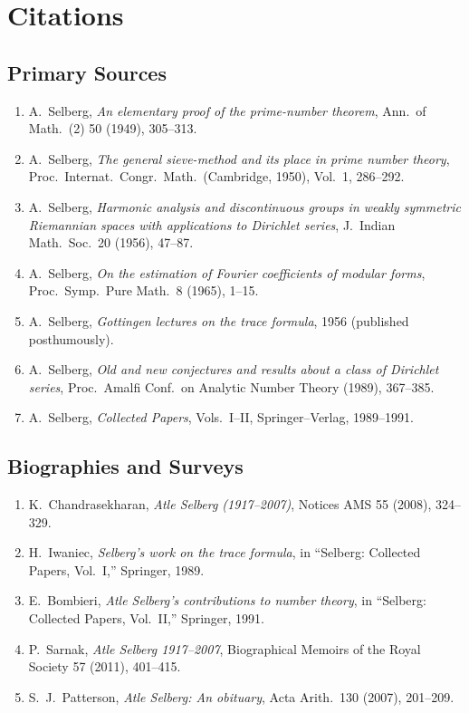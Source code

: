 \section{Citations}\subsection*{Primary Sources}
\begin{enumerate}
    \item A.\ Selberg, \textit{An elementary proof of the prime-number theorem}, Ann.\ of Math.\ (2) 50 (1949), 305--313.
    \item A.\ Selberg, \textit{The general sieve-method and its place in prime number theory}, Proc.\ Internat.\ Congr.\ Math.\ (Cambridge, 1950), Vol.\ 1, 286--292.
    \item A.\ Selberg, \textit{Harmonic analysis and discontinuous groups in weakly symmetric Riemannian spaces with applications to Dirichlet series}, J.\ Indian Math.\ Soc.\ 20 (1956), 47--87.
    \item A.\ Selberg, \textit{On the estimation of Fourier coefficients of modular forms}, Proc.\ Symp.\ Pure Math.\ 8 (1965), 1--15.
    \item A.\ Selberg, \textit{Gottingen lectures on the trace formula}, 1956 (published posthumously).
    \item A.\ Selberg, \textit{Old and new conjectures and results about a class of Dirichlet series}, Proc.\ Amalfi Conf.\ on Analytic Number Theory (1989), 367--385.
    \item A.\ Selberg, \textit{Collected Papers}, Vols.\ I--II, Springer--Verlag, 1989--1991.
\end{enumerate}

\subsection*{Biographies and Surveys}
\begin{enumerate}
    \item K.\ Chandrasekharan, \textit{Atle Selberg (1917--2007)}, Notices AMS 55 (2008), 324--329.
    \item H.\ Iwaniec, \textit{Selberg's work on the trace formula}, in ``Selberg: Collected Papers, Vol.\ I,'' Springer, 1989.
    \item E.\ Bombieri, \textit{Atle Selberg's contributions to number theory}, in ``Selberg: Collected Papers, Vol.\ II,'' Springer, 1991.
    \item P.\ Sarnak, \textit{Atle Selberg 1917--2007}, Biographical Memoirs of the Royal Society 57 (2011), 401--415.
    \item S.\ J.\ Patterson, \textit{Atle Selberg: An obituary}, Acta Arith.\ 130 (2007), 201--209.
\end{enumerate}

